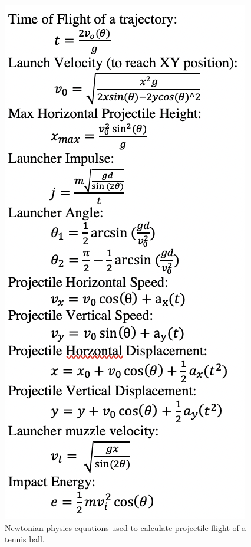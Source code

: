 \documentclass[11pt]{article}
\begin{document}
\begin{figure}[H]
    \centering
        \includegraphics[scale=.40, angle =0]{figures/physics model.png}
    \caption{Newtonian physics equations used to calculate projectile flight of a tennis ball.}
    \label{Projectile Physics models}
\end{figure}
\end{document}
